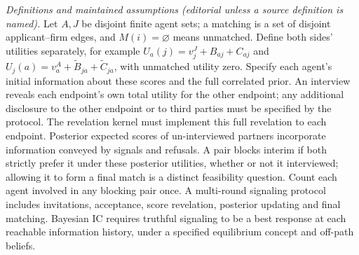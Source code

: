 \documentclass[11pt,a4paper]{article}
\begin{document}
\emph{Definitions and maintained assumptions (editorial unless a source definition is named).} Let \(A,J\) be disjoint finite agent sets; a matching is a set of disjoint applicant--firm edges, and \(M(i)=\varnothing\) means unmatched. Define both sides’ utilities separately, for example \(U_a(j)=v^J_j+B_{aj}+C_{aj}\) and \(U_j(a)=v^A_a+\widetilde B_{ja}+\widetilde C_{ja}\), with unmatched utility zero. Specify each agent’s initial information about these scores and the full correlated prior. An interview reveals each endpoint's own total utility for the other endpoint; any additional disclosure to the other endpoint or to third parties must be specified by the protocol. The revelation kernel must implement this full revelation to each endpoint. Posterior expected scores of un-interviewed partners incorporate information conveyed by signals and refusals. A pair blocks interim if both strictly prefer it under these posterior utilities, whether or not it interviewed; allowing it to form a final match is a distinct feasibility question. Count each agent involved in any blocking pair once. A multi-round signaling protocol includes invitations, acceptance, score revelation, posterior updating and final matching. Bayesian IC requires truthful signaling to be a best response at each reachable information history, under a specified equilibrium concept and off-path beliefs.
\end{document}
